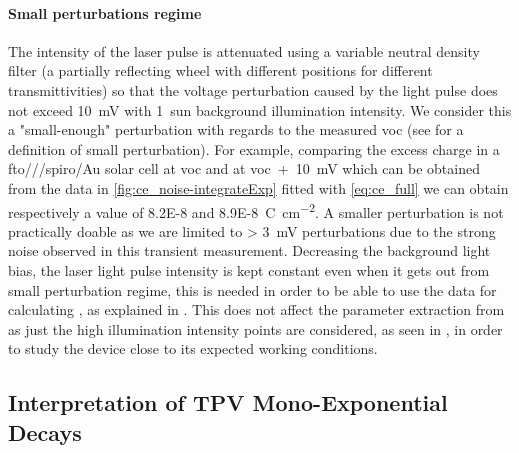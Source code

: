 	\paragraph{Small perturbations regime}\label{tpv_perturbation}
	The intensity of the laser pulse is attenuated using a variable neutral density filter (a partially reflecting wheel with different positions for different transmittivities) so that the voltage perturbation caused by the light pulse does not exceed \SI{10}{\mV} with 1~sun background illumination intensity.
	We consider this a "small\hyp{}enough" perturbation with regards to the measured \gls{voc} (see  for a definition of small perturbation).
	For example, comparing the excess charge in a \gls{fto}\-/\-/\-/\gls{spiro}\-/Au solar cell at \gls{voc} and at \gls{voc}~+~\SI{10}{\mV} which can be obtained from the data in \cref{fig:ce_noise-integrateExp} fitted with \cref{eq:ce_full} we can obtain respectively a value of \SI{8.2E-8}{} and \SI{8.9E-8}{\coulomb\per\square\cm}.
	A smaller perturbation is not practically doable as we are limited to \SI{> 3}{\mV} perturbations due to the strong noise observed in this transient measurement.
	Decreasing the background light bias, the laser light pulse intensity is kept constant even when it gets out from small perturbation regime, this is needed in order to be able to use the  data for calculating , as explained in .
	This does not affect the parameter extraction from  as just the high illumination intensity points are considered, as seen in , in order to study the device close to its expected working conditions.

	\subsection{Interpretation of TPV Mono\hyp{}Exponential Decays}

